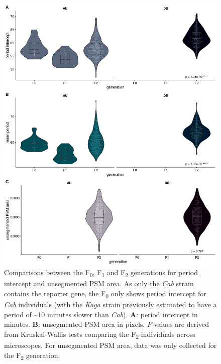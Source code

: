 \documentclass[
]{book}
\begin{document}
\begin{figure}
\includegraphics[width=1\linewidth]{figs/somites/phenotypes} \caption{Comparisons between the F\textsubscript{0}, F\textsubscript{1} and F\textsubscript{2} generations for period intercept and unsegmented PSM area. As only the \emph{Cab} strain contains the reporter gene, the F\textsubscript{0} only shows period intercept for \emph{Cab} individuals (with the \emph{Kaga} strain previously estimated to have a period of \textasciitilde10 minutes slower than \emph{Cab}). \textbf{A}: period intercept in minutes. \textbf{B}: unsegmented PSM area in pixels. \(P\)-values are derived from Kruskal-Wallis tests comparing the F\textsubscript{2} individuals across microscopes. For unsegmented PSM area, data was only collected for the F\textsubscript{2} generation.}\label{fig:somite-phenos}
\end{figure}
\end{document}
